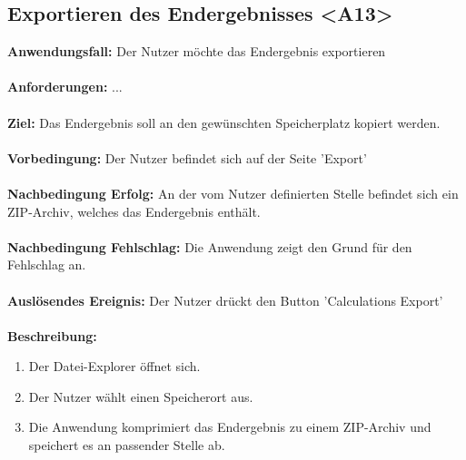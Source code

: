\documentclass[parskip=full]{scrartcl} %
\begin{document}
\subsection*{Exportieren des Endergebnisses <A13>}
\textbf{Anwendungsfall:} Der Nutzer möchte das Endergebnis exportieren\\\\
\textbf{Anforderungen:} ...\\\\
\textbf{Ziel:} Das Endergebnis soll an den gewünschten Speicherplatz kopiert werden. \\\\
\textbf{Vorbedingung:}  Der Nutzer befindet sich auf der Seite 'Export'\\\\
\textbf{Nachbedingung Erfolg:} An der vom Nutzer definierten Stelle befindet sich ein ZIP-Archiv, welches das Endergebnis enthält. \\\\
\textbf{Nachbedingung Fehlschlag:} Die Anwendung zeigt den Grund für den Fehlschlag an.\\\\
\textbf{Auslösendes Ereignis:} Der Nutzer drückt den Button 'Calculations Export' \\\\
\textbf{Beschreibung:}
\begin{enumerate}
    \item Der Datei-Explorer öffnet sich.
    \item Der Nutzer wählt einen Speicherort aus.
    \item Die Anwendung komprimiert das Endergebnis zu einem ZIP-Archiv und speichert es an passender Stelle ab.
\end{enumerate}
\newpage
\end{document}
